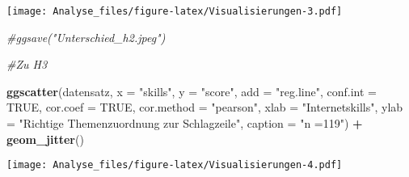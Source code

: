 \documentclass[]{article}
\newenvironment{Shaded}{\begin{snugshade}}{\end{snugshade}}
\newcommand{\KeywordTok}[1]{\textcolor[rgb]{0.13,0.29,0.53}{\textbf{#1}}}
\newcommand{\DataTypeTok}[1]{\textcolor[rgb]{0.13,0.29,0.53}{#1}}
\newcommand{\StringTok}[1]{\textcolor[rgb]{0.31,0.60,0.02}{#1}}
\newcommand{\CommentTok}[1]{\textcolor[rgb]{0.56,0.35,0.01}{\textit{#1}}}
\newcommand{\OtherTok}[1]{\textcolor[rgb]{0.56,0.35,0.01}{#1}}
\newcommand{\OperatorTok}[1]{\textcolor[rgb]{0.81,0.36,0.00}{\textbf{#1}}}
\newcommand{\NormalTok}[1]{#1}
\begin{document}
\begin{Shaded}
\end{Shaded}

\texttt{[image: Analyse\_files/figure-latex/Visualisierungen-3.pdf]}

\begin{Shaded}
\begin{Highlighting}[]
\CommentTok{#ggsave("Unterschied_h2.jpeg")}

\CommentTok{#Zu H3}

\KeywordTok{ggscatter}\NormalTok{(datensatz, }\DataTypeTok{x =} \StringTok{"skills"}\NormalTok{, }\DataTypeTok{y =} \StringTok{"score"}\NormalTok{, }
          \DataTypeTok{add =} \StringTok{"reg.line"}\NormalTok{, }\DataTypeTok{conf.int =} \OtherTok{TRUE}\NormalTok{, }
          \DataTypeTok{cor.coef =} \OtherTok{TRUE}\NormalTok{, }\DataTypeTok{cor.method =} \StringTok{"pearson"}\NormalTok{,}
          \DataTypeTok{xlab =} \StringTok{"Internetskills"}\NormalTok{, }\DataTypeTok{ylab =} \StringTok{"Richtige Themenzuordnung zur Schlagzeile"}\NormalTok{, }\DataTypeTok{caption =} \StringTok{"n =119"}\NormalTok{) }\OperatorTok{+}
\StringTok{  }\KeywordTok{geom_jitter}\NormalTok{()}
\end{Highlighting}
\end{Shaded}

\texttt{[image: Analyse\_files/figure-latex/Visualisierungen-4.pdf]}
\end{document}
